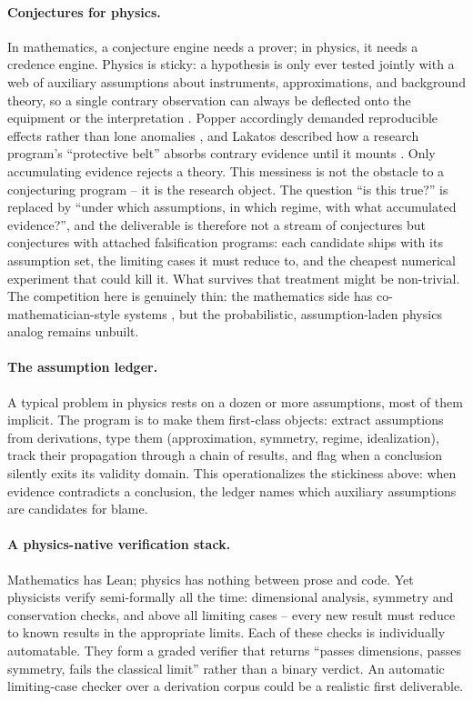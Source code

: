 \paragraph{Conjectures for physics.}
In mathematics, a conjecture engine needs a prover; in physics, it needs a credence engine. Physics is sticky: a hypothesis is only ever tested jointly with a web of auxiliary assumptions about instruments, approximations, and background theory, so a single contrary observation can always be deflected onto the equipment or the interpretation \cite{Duhem1954, Quine1951}. Popper accordingly demanded reproducible effects rather than lone anomalies \cite{Popper1959}, and Lakatos described how a research program's ``protective belt'' absorbs contrary evidence until it mounts \cite{Lakatos1970}. Only accumulating evidence rejects a theory. This messiness is not the obstacle to a conjecturing program -- it is the research object. The question ``is this true?'' is replaced by ``under which assumptions, in which regime, with what accumulated evidence?'', and the deliverable is therefore not a stream of conjectures but conjectures with attached falsification programs: each candidate ships with its assumption set, the limiting cases it must reduce to, and the cheapest numerical experiment that could kill it. What survives that treatment might be non-trivial. The competition here is genuinely thin: the mathematics side has co-mathematician-style systems \cite{2605.06651}, but the probabilistic, assumption-laden physics analog remains unbuilt.

\paragraph{The assumption ledger.}
A typical problem in physics rests on a dozen or more assumptions, most of them implicit. The program is to make them first-class objects: extract assumptions from derivations, type them (approximation, symmetry, regime, idealization), track their propagation through a chain of results, and flag when a conclusion silently exits its validity domain. This operationalizes the stickiness above: when evidence contradicts a conclusion, the ledger names which auxiliary assumptions are candidates for blame.

\paragraph{A physics-native verification stack.}
Mathematics has Lean; physics has nothing between prose and code. Yet physicists verify semi-formally all the time: dimensional analysis, symmetry and conservation checks, and above all limiting cases -- every new result must reduce to known results in the appropriate limits. Each of these checks is individually automatable. They form a graded verifier that returns ``passes dimensions, passes symmetry, fails the classical limit'' rather than a binary verdict. An automatic limiting-case checker over a derivation corpus could be a realistic first deliverable.

